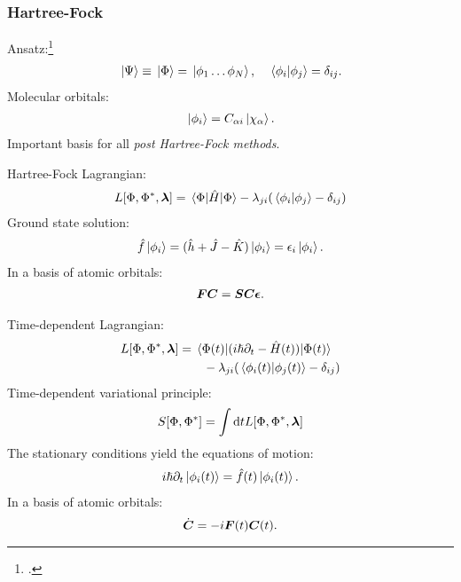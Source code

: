 \documentclass{beamer}
\begin{document}
\begin{frame}
    \frametitle{Hartree-Fock}
    Ansatz:\footcite{szabo1996modern}
    \begin{align}
        \ket*{\Psi} \equiv \ket*{\Phi}
        = \ket*{\phi_1 \dots \phi_N},
        \quad
        \braket*{\phi_i}{\phi_j} = \delta_{ij}.
    \end{align}
    Molecular orbitals:
    \begin{align}
        \ket*{\phi_i} = C_{\alpha i}\ket*{\chi_{\alpha}}.
    \end{align}
    Important basis for all \emph{post Hartree-Fock methods}.
\end{frame}

\begin{frame}
    Hartree-Fock Lagrangian:
    \begin{align}
        L[\Phi, \Phi^{*}, \boldsymbol{\lambda}]
        = \mel*{\Phi}{\hat{H}}{\Phi}
        - \lambda_{ji}(\braket*{\phi_i}{\phi_j} - \delta_{ij})
    \end{align}
    Ground state solution:
    \begin{gather}
        \hat{f}\ket*{\phi_i}
        = (\hat{h} + \hat{J} - \hat{K})\ket*{\phi_i}
        = \epsilon_i\ket*{\phi_i}.
    \end{gather}
    In a basis of atomic orbitals:
    \begin{gather}
        \boldsymbol{F}\boldsymbol{C} = \boldsymbol{S}\boldsymbol{C}\boldsymbol{\epsilon}.
    \end{gather}
\end{frame}

\begin{frame}
    Time-dependent Lagrangian:
    \begin{align}
        L[\Phi, \Phi^{*}, \boldsymbol{\lambda}]
        &=
        \mel*{\Phi(t)}{
            (i\hslash\partial_t - \hat{H}(t))
        }{\Phi(t)}
        \nonumber \\
        &\qquad
        - \lambda_{ji}
        (\braket*{\phi_i(t)}{\phi_j(t)} - \delta_{ij})
    \end{align}
    Time-dependent variational principle:
    \begin{align}
        S[\Phi, \Phi^{*}]
        = \int \dd t
        L[\Phi, \Phi^{*}, \boldsymbol{\lambda}]
    \end{align}
    The stationary conditions yield the equations of motion:
    \begin{gather}
        i\hslash\partial_t\ket*{\phi_i(t)}
        = \hat{f}(t)\ket*{\phi_i(t)}.
    \end{gather}
    In a basis of atomic orbitals:
    \begin{gather}
        \dot{\boldsymbol{C}} = -i\boldsymbol{F}(t)\boldsymbol{C}(t).
    \end{gather}
\end{frame}
\end{document}
